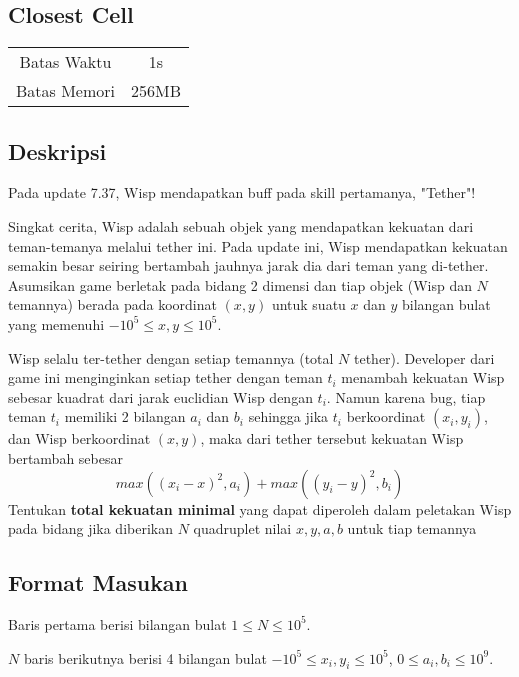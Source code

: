 \documentclass{article}
\begin{document}
\begin{center}
    \section*{Closest Cell} %

    \begin{tabular}{ | c c | }
        \hline
        Batas Waktu  & 1s \\    %
        Batas Memori & 256MB \\  %
        \hline
    \end{tabular}
\end{center}

\subsection*{Deskripsi}
Pada update 7.37, Wisp mendapatkan buff pada skill pertamanya, "Tether"!

Singkat cerita, Wisp adalah sebuah objek yang mendapatkan kekuatan dari teman-temanya melalui tether ini. Pada update ini, Wisp mendapatkan kekuatan semakin besar seiring bertambah jauhnya jarak dia dari teman yang di-tether. Asumsikan game berletak pada bidang 2 dimensi dan tiap objek (Wisp dan $N$ temannya) berada pada koordinat $(x, y)$ untuk suatu $x$ dan $y$ bilangan bulat yang memenuhi $-10^5 \leq x, y \leq 10^5$.

Wisp selalu ter-tether dengan setiap temannya (total $N$ tether). Developer dari game ini menginginkan setiap tether dengan teman $t_i$ menambah kekuatan Wisp sebesar kuadrat dari jarak euclidian Wisp dengan $t_i$. Namun karena bug, tiap teman $t_i$ memiliki 2 bilangan $a_i$ dan $b_i$ sehingga jika $t_i$ berkoordinat $(x_i, y_i)$, dan Wisp berkoordinat $(x, y)$, maka dari tether tersebut kekuatan Wisp bertambah sebesar
$$ max((x_i - x)^2, a_i) + max((y_i - y)^2, b_i)$$
Tentukan \textbf{total kekuatan minimal} yang dapat diperoleh dalam peletakan Wisp pada bidang jika diberikan $N$ quadruplet nilai $x, y, a, b$ untuk tiap temannya

\subsection*{Format Masukan}

Baris pertama berisi bilangan bulat $1 \leq N \leq 10^5$.

$N$ baris berikutnya berisi 4 bilangan bulat $-10^5 \leq x_i, y_i \leq 10^5$, $0 \leq a_i, b_i \leq 10^9$.
\end{document}
